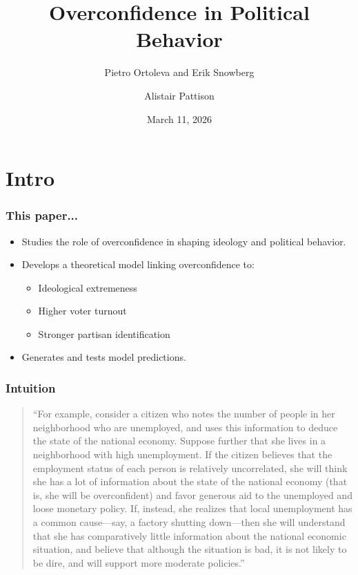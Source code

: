 \documentclass[memey]{ali-presentation}
\title{Overconfidence in Political Behavior}
\subtitle{Pietro Ortoleva and Erik Snowberg}
\date{March 11, 2026}
\author{Alistair Pattison}
\begin{document}
\maketitle

\section{Intro}

\begin{frame}
  \frametitle{This paper...}
  
  \begin{itemize}
    \item Studies the role of overconfidence in shaping ideology and political behavior.
    \item Develops a theoretical model linking overconfidence to:
      \begin{itemize}
        \item Ideological extremeness
        \item Higher voter turnout
        \item Stronger partisan identification
      \end{itemize}
    \item Generates and tests model predictions.
  \end{itemize}

\end{frame}

\begin{frame}
  \frametitle{Intuition}
  \begin{quote}
    ``For example, consider a
    citizen who notes the number of people in her neighborhood who are unemployed,
    and uses this information to deduce the state of the national economy. Suppose
    further that she lives in a neighborhood with high unemployment. If the citizen
    believes that the employment status of each person is relatively uncorrelated, she
    will think she has a lot of information about the state of the national economy
    (that is, she will be overconfident) and favor generous aid to the unemployed and
    loose monetary policy. If, instead, she realizes that local unemployment has a
    common cause—say, a factory shutting down—then she will understand that she
    has comparatively little information about the national economic situation, and
    believe that although the situation is bad, it is not likely to be dire, and will support
    more moderate policies.''
  \end{quote}
\end{frame}
\end{document}

